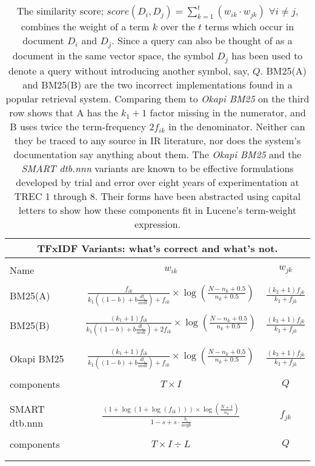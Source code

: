 \begin{table}
  \centering
  \small
  \begin{minipage}[t]{0.65\textwidth}
    
    \begin{tabular}{lcc}
      \multicolumn{3}{c}{TFxIDF Variants: what's correct and what's not.}\\
      \hline\hline
      \\
      Name & $w_{ik}$ & $w_{jk}$\\
      \hline
      \\
      BM25(A)
      & $\frac{f_{ik}}{k_{1}((1-b)+b\frac{dl_{i}}{avdl})+f_{ik}} \times \log(\frac{N-n_{k}+0.5}{n_{k}+0.5})$
      & $\frac{(k_{3}+1)f_{jk}}{k_{3}+f_{jk}}$ \\
      \\
      BM25(B)
      & $\frac{(k_{1}+1)f_{ik}}{k_{1}((1-b)+b\frac{dl_{i}}{avdl})+2f_{ik}} \times \log(\frac{N-n_{k}+0.5}{n_{k}+0.5})$
      & $\frac{(k_{3}+1)f_{jk}}{k_{3}+f_{jk}}$ \\
      \\\hline
      \\
      Okapi BM25
      & $\frac{(k_{1}+1)f_{ik}}{k_{1}((1-b)+b\frac{dl_{i}}{avdl})+f_{ik}} \times \log(\frac{N-n_{k}+0.5}{n_{k}+0.5})$
      & $\frac{(k_{3}+1)f_{jk}}{k_{3}+f_{jk}}$ \\
      \\
      components & $T \times I$ & $Q$ \\
      \\\hline
      \\
      SMART dtb.nnn
      & $\frac{(1+\log(1+\log(f_{ik}))) \times \log(\frac{N+1}{n_{k}})}{1-s+s \cdot \frac{b_{i}}{avgb}}$
      & $f_{jk}$ \\
      \\
      components & $T \times I \div L$ & $Q$ \\
      \\\hline\hline
      \label{tab:tfxidf}
    \end{tabular}
    \caption{ The similarity score;
      $score(D_{i},D_{j})=\sum_{k=1}^{t}(w_{ik} \cdot w_{jk})$
      $\forall i \neq j$, combines the weight of a term $k$ over the
      $t$ terms which occur in document $D_{i}$ and $D_{j}$. Since a
      query can also be thought of as a document in the same vector
      space, the symbol $D_{j}$ has been used to denote a query
      without introducing another symbol, say, $Q$. BM25(A) and
      BM25(B) are the two incorrect implementations found in a popular
      retrieval system. Comparing them to \emph{Okapi BM25} on the
      third row shows that A has the $k_{1}+1$ factor missing in the
      numerator, and B uses twice the term-frequency $2f_{ik}$ in the
      denominator. Neither can they be traced to any source in IR
      literature, nor does the system's documentation say anything
      about them. The \emph{Okapi BM25} and the \emph{SMART dtb.nnn}
      variants are known to be effective formulations developed by
      trial and error over eight years of experimentation at TREC 1
      through 8. Their forms have been abstracted using capital
      letters to show how these components fit in Lucene's term-weight
      expression.}


\end{minipage}
\end{table}
